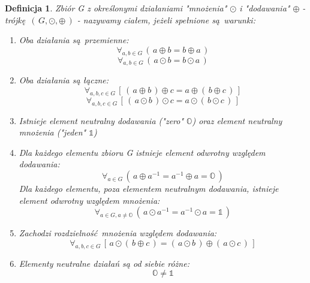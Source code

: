 \documentclass{article}
\newtheorem{definition}{Definicja}[section]
\begin{document}
    \begin{definition}
        Zbiór G z określonymi działaniami "mnożenia" $\odot$ i "dodawania" $\oplus$ - trójkę $(\, G, \odot, \oplus\,)$ - nazywamy ciałem, jeżeli spełnione są warunki:
        \begin{enumerate}
            \item Oba działania są przemienne:
                \begin{equation*}
                    \forall_{a,b \in G} \, (\,a \oplus b = b \oplus a\,)
                \end{equation*}
                \begin{equation*}
                    \forall_{a,b \in G} \, (\,a \odot b = b \odot a\,)
                \end{equation*}
            \item Oba działania są łączne:
                \begin{equation*}
                    \forall_{a,b,c \in G} \, [\, (\,a \oplus b\,) \oplus c = a \oplus (\,b \oplus c\,)\,]
                \end{equation*}
                \begin{equation*}
                    \forall_{a,b,c \in G} \, [\, (\,a \odot b\,) \odot c = a \odot (\,b \odot c\,)\,]
                \end{equation*}
            \item Istnieje element neutralny dodawania ("zero" $\mathds{O}$) oraz element neutralny mnożenia ("jeden" $\mathds{1}$)
            \item Dla każdego elementu zbioru G istnieje element odwrotny względem dodawania:
                \begin{equation*}
                    \forall_{a \in G} \, (\, a \oplus a^{-1} = a^{-1} \oplus a = \mathds{O}\,)
                \end{equation*}
                Dla każdego elementu, poza elementem neutralnym dodawania, istnieje element odwrotny względem mnożenia:
                \begin{equation*}
                    \forall_{a \in G, a \neq \mathds{O}} \, (\, a \odot a^{-1} = a^{-1} \odot a = \mathds{1}\,)
                \end{equation*}
            \item Zachodzi rozdzielność mnożenia względem dodawania:
                \begin{equation*}
                    \forall_{a,b,c \in G} \, [\, a \odot (\, b \oplus c\,) = (\, a \odot b \,) \oplus (\, a \odot c\, )\,]
                \end{equation*}
            \item Elementy neutralne działań są od siebie różne:
                \begin{equation*}
                    \mathds{O} \neq \mathds{1}
                \end{equation*}
        \end{enumerate}
    \end{definition}
\end{document}
